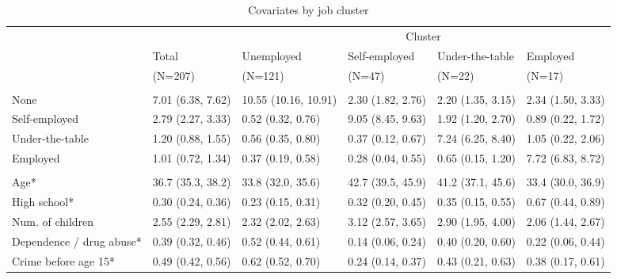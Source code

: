 
\begin{table}[htp]
\scriptsize
\caption{Covariates by job cluster}
\label{tab:desc_job_clusters}
\setlength{\tabcolsep}{5pt}
\renewcommand{\arraystretch}{1.3}
\begin{threeparttable}
\begin{tabular}{llllll}
\hline
\addlinespace[8pt]
& & \multicolumn{4}{c}{Cluster} \\
\addlinespace
\cmidrule(lr){3-6} 
\addlinespace
& \multicolumn{1}{l}{Total} & \multicolumn{1}{l}{Unemployed} & \multicolumn{1}{l}{Self-employed} & \multicolumn{1}{l}{Under-the-table} & \multicolumn{1}{l}{Employed} \\
& \multicolumn{1}{l}{(N=207)} & \multicolumn{1}{l}{(N=121)} & \multicolumn{1}{l}{(N=47)} & \multicolumn{1}{l}{(N=22)} & \multicolumn{1}{l}{(N=17)} \\
\addlinespace[8pt]
\hline
\addlinespace[12pt]
\multicolumn{6}{l}{\textbf{Time spent on job (months)}} \\
\addlinespace
\quad None & 7.01 (6.38, 7.62) & 10.55 (10.16, 10.91) & 2.30 (1.82, 2.76) & 2.20 (1.35, 3.15) & 2.34 (1.50, 3.33) \\ 
  \quad Self-employed & 2.79 (2.27, 3.33) & 0.52 (0.32, 0.76) & 9.05 (8.45, 9.63) & 1.92 (1.20, 2.70) & 0.89 (0.22, 1.72) \\ 
  \quad Under-the-table & 1.20 (0.88, 1.55) & 0.56 (0.35, 0.80) & 0.37 (0.12, 0.67) & 7.24 (6.25, 8.40) & 1.05 (0.22, 2.06) \\ 
  \quad Employed & 1.01 (0.72, 1.34) & 0.37 (0.19, 0.58) & 0.28 (0.04, 0.55) & 0.65 (0.15, 1.20) & 7.72 (6.83, 8.72) \\ 
  \addlinespace[12pt]
\multicolumn{6}{l}{\textbf{Covariates (average)*}} \\
\addlinespace
\quad Age* & 36.7 (35.3, 38.2) & 33.8 (32.0, 35.6) & 42.7 (39.5, 45.9) & 41.2 (37.1, 45.6) & 33.4 (30.0, 36.9) \\ 
  \quad High school* & 0.30 (0.24, 0.36) & 0.23 (0.15, 0.31) & 0.32 (0.20, 0.45) & 0.35 (0.15, 0.55) & 0.67 (0.44, 0.89) \\ 
  \quad Num. of children & 2.55 (2.29, 2.81) & 2.32 (2.02, 2.63) & 3.12 (2.57, 3.65) & 2.90 (1.95, 4.00) & 2.06 (1.44, 2.67) \\ 
  \quad Dependence / drug abuse* & 0.39 (0.32, 0.46) & 0.52 (0.44, 0.61) & 0.14 (0.06, 0.24) & 0.40 (0.20, 0.60) & 0.22 (0.06, 0.44) \\ 
  \quad Crime before age 15* & 0.49 (0.42, 0.56) & 0.62 (0.52, 0.70) & 0.24 (0.14, 0.37) & 0.43 (0.21, 0.63) & 0.38 (0.17, 0.61) \\ 

\end{tabular}
\end{threeparttable}
\end{table}
